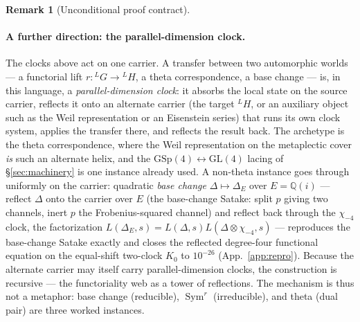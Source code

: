\documentclass[11pt]{article}
\theoremstyle{definition}
\newtheorem{remark}[theorem]{Remark}
\newcommand{\Sym}{\operatorname{Sym}}
\begin{document}
\begin{remark}[Unconditional proof contract]
\begin{enumerate}
\paragraph{A further direction: the parallel-dimension clock.} The clocks above act on one carrier. A
transfer between two automorphic worlds --- a functorial lift $r:{}^{L}G\to{}^{L}H$, a theta
correspondence, a base change --- is, in this language, a \emph{parallel-dimension clock}: it absorbs the
local state on the source carrier, reflects it onto an alternate carrier (the target ${}^{L}H$, or an
auxiliary object such as the Weil representation or an Eisenstein series) that runs its own clock system,
applies the transfer there, and reflects the result back. The archetype is the theta correspondence, where
the Weil representation on the metaplectic cover \emph{is} such an alternate helix, and the
$\mathrm{GSp}(4)\leftrightarrow\mathrm{GL}(4)$ lacing of \S\ref{sec:machinery} is one instance already
used. A non-theta instance goes through uniformly on the carrier: quadratic \emph{base change}
$\Delta\mapsto\Delta_E$ over $E=\mathbb Q(i)$ --- reflect $\Delta$ onto the carrier over $E$ (the
base-change Satake: split $p$ giving two channels, inert $p$ the Frobenius-squared channel) and reflect
back through the $\chi_{-4}$ clock, the factorization $L(\Delta_E,s)=L(\Delta,s)L(\Delta\otimes\chi_{-4},s)$
--- reproduces the base-change Satake exactly and closes the reflected degree-four functional equation on
the equal-shift two-clock $K_0$ to $10^{-26}$ (App.~\ref{app:repro}). Because the alternate carrier may
itself carry parallel-dimension clocks, the construction is recursive --- the functoriality web as a tower
of reflections. The mechanism is thus not a metaphor: base change (reducible), $\Sym^r$ (irreducible), and
theta (dual pair) are three worked instances.


\end{enumerate}
\end{remark}
\end{document}
